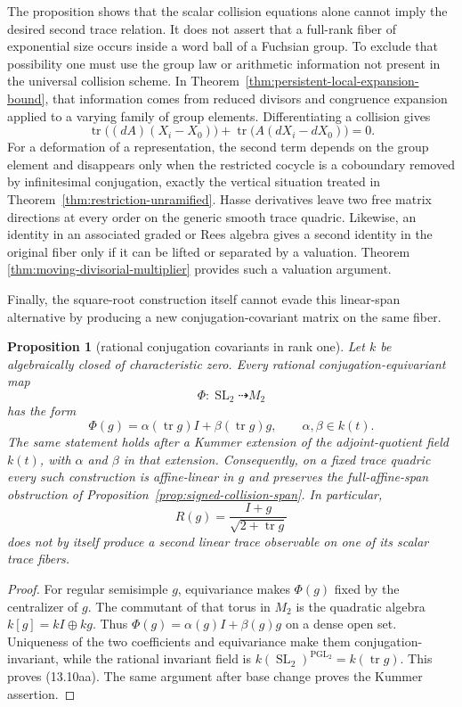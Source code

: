\documentclass[11pt,reqno]{amsart}
\newtheorem{proposition}[theorem]{Proposition}
\theoremstyle{definition}
\theoremstyle{remark}
\newcommand{\Tr}{\operatorname{tr}}
\newcommand{\SL}{\operatorname{SL}}
\newcommand{\PGL}{\operatorname{PGL}}
\begin{document}
The proposition shows that the scalar collision equations alone cannot
imply the desired second trace relation.  It does not assert that a
full-rank fiber of exponential size occurs inside a word ball of a Fuchsian
group.  To exclude that possibility one must use the group law or arithmetic
information not present in the universal collision scheme.  In
Theorem~\ref{thm:persistent-local-expansion-bound}, that information comes
from reduced divisors and congruence expansion applied to a varying family
of group elements.  Differentiating a collision gives
\[
 \Tr\bigl((dA)(X_i-X_0)\bigr)
 +\Tr\bigl(A(dX_i-dX_0)\bigr)=0.
\]
For a deformation of a representation, the second term depends on the
group element and disappears only when the restricted cocycle is a
coboundary removed by infinitesimal conjugation, exactly the vertical
situation treated in Theorem~\ref{thm:restriction-unramified}.  Hasse
derivatives leave two free matrix directions at every order on the generic
smooth trace quadric.  Likewise, an identity in an associated graded or Rees
algebra gives a second identity in the original fiber only if it can be
lifted or separated by a valuation.  Theorem
\ref{thm:moving-divisorial-multiplier} provides such a valuation argument.

Finally, the square-root construction itself cannot evade this linear-span
alternative by producing a new conjugation-covariant matrix on the same
fiber.

\begin{proposition}[rational conjugation covariants in rank one]
\label{prop:rank-one-rational-covariants}
Let \(k\) be algebraically closed of characteristic zero.  Every rational
conjugation-equivariant map
\[
 \Phi\colon\SL_2\dashrightarrow M_2
\]
has the form
\[
 \Phi(g)=\alpha(\Tr g)I+\beta(\Tr g)g,
 \qquad \alpha,\beta\in k(t).
\tag{13.10aa}
\]
The same statement holds after a Kummer extension of the
adjoint-quotient field \(k(t)\), with \(\alpha\) and \(\beta\) in that
extension.  Consequently, on a fixed trace quadric every such construction
is affine-linear in \(g\) and preserves the full-affine-span obstruction of
Proposition~\ref{prop:signed-collision-span}.  In particular,
\[
 R(g)=\frac{I+g}{\sqrt{2+\Tr g}}
\]
does not by itself produce a second linear trace observable on one of its
scalar trace fibers.
\end{proposition}

\begin{proof}
For regular semisimple \(g\), equivariance makes \(\Phi(g)\) fixed by the
centralizer of \(g\).  The commutant of that torus in \(M_2\) is the
quadratic algebra \(k[g]=kI\oplus kg\).  Thus
\(\Phi(g)=\alpha(g)I+\beta(g)g\) on a dense open set.  Uniqueness of the
two coefficients and equivariance make them conjugation-invariant, while
the rational invariant field is
\(k(\SL_2)^{\PGL_2}=k(\Tr g)\).  This proves (13.10aa).  The same argument
after base change proves the Kummer assertion.
\end{proof}
\end{document}
